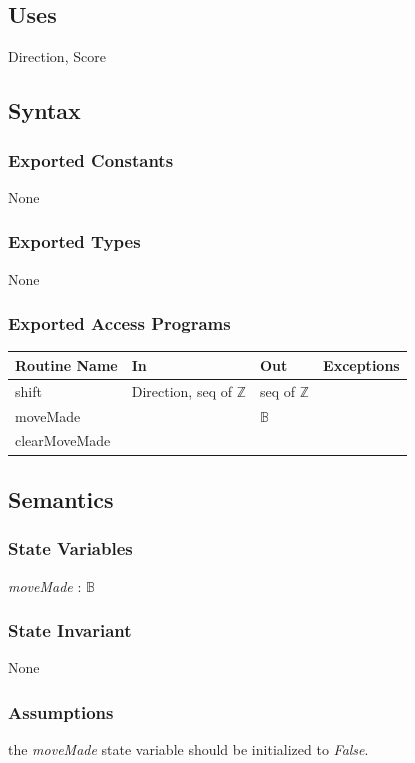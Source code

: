 \documentclass{article}
\begin{document}
	\subsection*{Uses}
		Direction, Score

	\subsection*{Syntax}

		\subsubsection*{Exported Constants}
			None

		\subsubsection*{Exported Types}
			None

		\subsubsection*{Exported Access Programs}
			\begin{tabular}{|l|l|l|p{5cm}|}
				\hline
				\textbf{Routine Name} & \textbf{In} & \textbf{Out} & \textbf{Exceptions} \\
				\hline
				shift & Direction, seq of $\mathbb{Z}$ & seq of $\mathbb{Z}$ & \\
				\hline
				moveMade & & $\mathbb{B}$ & \\
				\hline
				clearMoveMade & & & \\
				\hline
			\end{tabular}

	\subsection*{Semantics}

		\subsubsection*{State Variables}
			\textit{moveMade} : $\mathbb{B}$

		\subsubsection*{State Invariant}
			None

		\subsubsection*{Assumptions}
			the \textit{moveMade} state variable should be initialized to \textit{False}.
\end{document}
